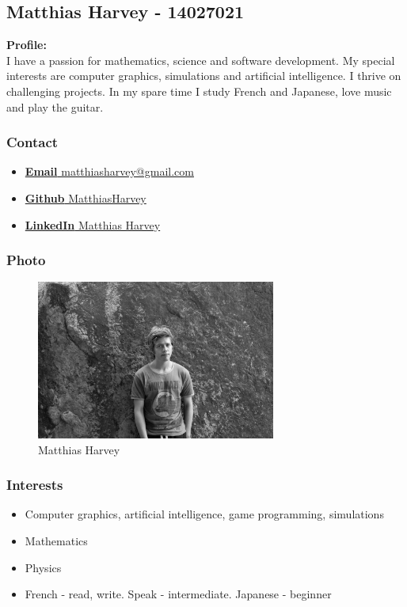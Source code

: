 \documentclass{article}
\begin{document}
	\cleardoublepage

	\subsection{Matthias Harvey - 14027021}
	\textbf{Profile:}\\
	I have a passion for mathematics, science and software development. My special interests are computer graphics, simulations and artificial intelligence. I thrive on challenging projects. In my spare time I study French and Japanese, love music and play the guitar.
	\subsubsection{Contact}
	\begin{itemize}	
		\item \href{mailto:matthiasharvey@gmail.com}
		{\textbf{Email} matthiasharvey@gmail.com}
		\item \href{https://github.com/MatthiasHarvey}
		{\textbf{Github} MatthiasHarvey}
		\item \href{https://za.linkedin.com/in/matthias-harvey-68b30995}
		{\textbf{LinkedIn} Matthias Harvey}
	\end{itemize}
	\subsubsection{Photo}
	\begin{figure}[H]
		\centering
		\includegraphics[width=0.7\textwidth]{../matthias.jpg}
		\caption{Matthias Harvey}
	\end{figure}
	\subsubsection{Interests}
	\begin{itemize}
		\item Computer graphics, artificial intelligence, game programming, simulations
		\item Mathematics
		\item Physics
		\item French - read, write. Speak - intermediate. Japanese - beginner
	\end{itemize}
\end{document}

